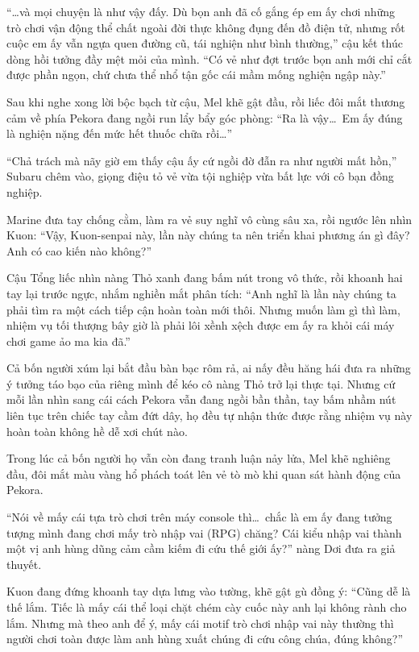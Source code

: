 \documentclass[../main.tex]{subfiles}
\begin{document}
``\dots và mọi chuyện là như vậy đấy. Dù bọn anh đã cố gắng ép em ấy chơi những trò chơi vận động thể chất ngoài đời thực không đụng đến đồ điện tử, nhưng rốt cuộc em ấy vẫn ngựa quen đường cũ, tái nghiện như bình thường,'' cậu kết thúc dòng hồi tưởng đầy mệt mỏi của mình. ``Có vẻ như đợt trước bọn anh mới chỉ cắt được phần ngọn, chứ chưa thể nhổ tận gốc cái mầm mống nghiện ngập này.''

Sau khi nghe xong lời bộc bạch từ cậu, Mel khẽ gật đầu, rồi liếc đôi mắt thương cảm về phía Pekora đang ngồi run lẩy bẩy góc phòng: ``Ra là vậy\dots\ Em ấy đúng là nghiện nặng đến mức hết thuốc chữa rồi\dots''

``Chả trách mà nãy giờ em thấy cậu ấy cứ ngồi đờ đẫn ra như người mất hồn,'' Subaru chêm vào, giọng điệu tỏ vẻ vừa tội nghiệp vừa bất lực với cô bạn đồng nghiệp.

Marine đưa tay chống cằm, làm ra vẻ suy nghĩ vô cùng sâu xa, rồi ngước lên nhìn Kuon: ``Vậy, Kuon-senpai này, lần này chúng ta nên triển khai phương án gì đây? Anh có cao kiến nào không?''

Cậu Tổng liếc nhìn nàng Thỏ xanh đang bấm nút trong vô thức, rồi khoanh hai tay lại trước ngực, nhắm nghiền mắt phân tích: ``Anh nghĩ là lần này chúng ta phải tìm ra một cách tiếp cận hoàn toàn mới thôi. Nhưng muốn làm gì thì làm, nhiệm vụ tối thượng bây giờ là phải lôi xềnh xệch được em ấy ra khỏi cái máy chơi game ảo ma kia đã.''

Cả bốn người xúm lại bắt đầu bàn bạc rôm rả, ai nấy đều hăng hái đưa ra những ý tưởng táo bạo của riêng mình để kéo cô nàng Thỏ trở lại thực tại. Nhưng cứ mỗi lần nhìn sang cái cách Pekora vẫn đang ngồi bần thần, tay bấm nhầm nút liên tục trên chiếc tay cầm đứt dây, họ đều tự nhận thức được rằng nhiệm vụ này hoàn toàn không hề dễ xơi chút nào.

\ct

Trong lúc cả bốn người họ vẫn còn đang tranh luận nảy lửa, Mel khẽ nghiêng đầu, đôi mắt màu vàng hổ phách toát lên vẻ tò mò khi quan sát hành động của Pekora.

``Nói về mấy cái tựa trò chơi trên máy console thì\dots\ chắc là em ấy đang tưởng tượng mình đang chơi mấy trò nhập vai (RPG) chăng? Cái kiểu nhập vai thành một vị anh hùng dũng cảm cầm kiếm đi cứu thế giới ấy?'' nàng Dơi đưa ra giả thuyết.

Kuon đang đứng khoanh tay dựa lưng vào tường, khẽ gật gù đồng ý: ``Cũng dễ là thế lắm. Tiếc là mấy cái thể loại chặt chém cày cuốc này anh lại không rành cho lắm. Nhưng mà theo anh để ý, mấy cái motif trò chơi nhập vai này thường thì người chơi toàn được làm anh hùng xuất chúng đi cứu công chúa, đúng không?''
\end{document}
